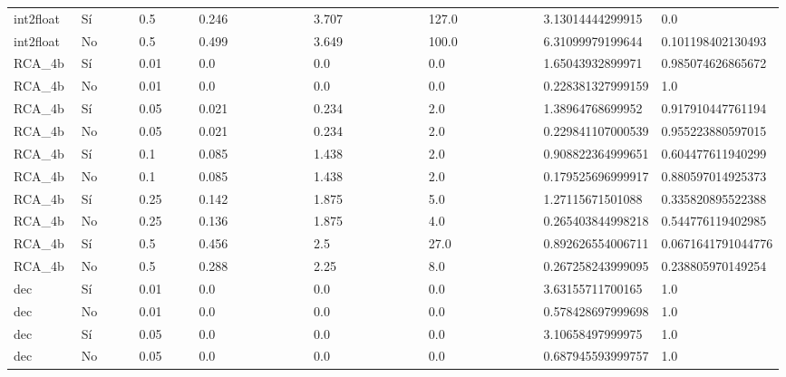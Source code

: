 {{\begin{longtable}{M{0.09\linewidth}M{0.09\linewidth}M{0.09\linewidth}M{0.09\linewidth}M{0.09\linewidth}M{0.09\linewidth}M{0.09\linewidth}M{0.09\linewidth}M{0.09\linewidth}M{0.09\linewidth}M{0.09\linewidth}}
int2float & Sí & \num{0.5} & \num{0.246} &   & \num{3.707} &   & \num{127.0} &   & \num{3.13014444299915} & \num{0.0} \\
int2float & No & \num{0.5} & \num{0.499} &   & \num{3.649} &   & \num{100.0} &   & \num{6.31099979199644} & \num{0.101198402130493} \\
RCA\_4b & Sí & \num{0.01} & \num{0.0} &   & \num{0.0} &   & \num{0.0} &   & \num{1.65043932899971} & \num{0.985074626865672} \\
RCA\_4b & No & \num{0.01} & \num{0.0} &   & \num{0.0} &   & \num{0.0} &   & \num{0.228381327999159} & \num{1.0} \\
RCA\_4b & Sí & \num{0.05} & \num{0.021} &   & \num{0.234} &   & \num{2.0} &   & \num{1.38964768699952} & \num{0.917910447761194} \\
RCA\_4b & No & \num{0.05} & \num{0.021} &   & \num{0.234} &   & \num{2.0} &   & \num{0.229841107000539} & \num{0.955223880597015} \\
RCA\_4b & Sí & \num{0.1} & \num{0.085} &   & \num{1.438} &   & \num{2.0} &   & \num{0.908822364999651} & \num{0.604477611940299} \\
RCA\_4b & No & \num{0.1} & \num{0.085} &   & \num{1.438} &   & \num{2.0} &   & \num{0.179525696999917} & \num{0.880597014925373} \\
RCA\_4b & Sí & \num{0.25} & \num{0.142} &   & \num{1.875} &   & \num{5.0} &   & \num{1.27115671501088} & \num{0.335820895522388} \\
RCA\_4b & No & \num{0.25} & \num{0.136} &   & \num{1.875} &   & \num{4.0} &   & \num{0.265403844998218} & \num{0.544776119402985} \\
RCA\_4b & Sí & \num{0.5} & \num{0.456} &   & \num{2.5} &   & \num{27.0} &   & \num{0.892626554006711} & \num{0.0671641791044776} \\
RCA\_4b & No & \num{0.5} & \num{0.288} &   & \num{2.25} &   & \num{8.0} &   & \num{0.267258243999095} & \num{0.238805970149254} \\
dec & Sí & \num{0.01} & \num{0.0} &   & \num{0.0} &   & \num{0.0} &   & \num{3.63155711700165} & \num{1.0} \\
dec & No & \num{0.01} & \num{0.0} &   & \num{0.0} &   & \num{0.0} &   & \num{0.578428697999698} & \num{1.0} \\
dec & Sí & \num{0.05} & \num{0.0} &   & \num{0.0} &   & \num{0.0} &   & \num{3.10658497999975} & \num{1.0} \\
dec & No & \num{0.05} & \num{0.0} &   & \num{0.0} &   & \num{0.0} &   & \num{0.687945593999757} & \num{1.0} \\

\end{longtable}}}
